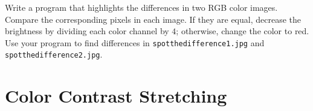 \documentclass{book}
\begin{document}
\begin{exercise}
Write a program that highlights the differences in two RGB color images. Compare the corresponding pixels in each image. If they are equal, decrease the brightness by dividing each color channel by $4$; otherwise, change the color to red. Use your program to find differences in \texttt{spotthedifference1.jpg} and \texttt{spotthedifference2.jpg}.
\end{exercise}

\section{Color Contrast Stretching}\label{sec:color-contrast-stretching}

\end{document}
